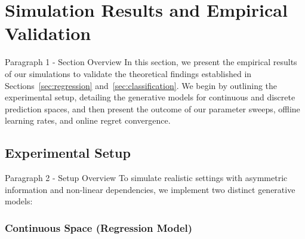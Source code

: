 \section{Simulation Results and Empirical Validation}
\label{sec:experiments}

\begin{sourceblock}{Paragraph 1 - Section Overview}
In this section, we present the empirical results of our simulations to validate the theoretical findings established in Sections~\ref{sec:regression} and~\ref{sec:classification}. We begin by outlining the experimental setup, detailing the generative models for continuous and discrete prediction spaces, and then present the outcome of our parameter sweeps, offline learning rates, and online regret convergence.
\end{sourceblock}

\begin{faqblock}
\faqanswers
{}
\end{faqblock}

\subsection{Experimental Setup}

\begin{sourceblock}{Paragraph 2 - Setup Overview}
To simulate realistic settings with asymmetric information and non-linear dependencies, we implement two distinct generative models:
\end{sourceblock}

\begin{faqblock}
\faqanswers
{}
\end{faqblock}

\subsubsection{Continuous Space (Regression Model)}

